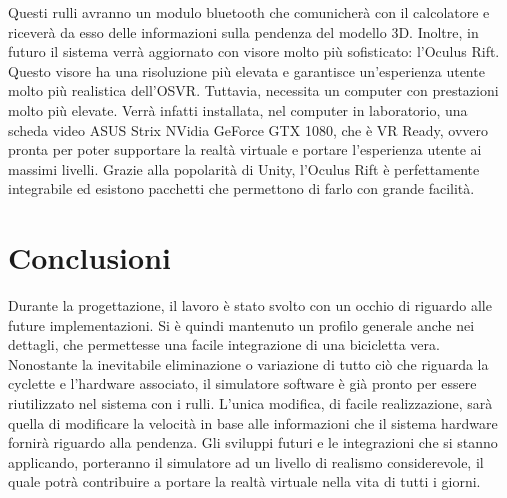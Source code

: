 \noindent Questi rulli avranno un modulo bluetooth che comunicherà con il calcolatore e riceverà da esso delle informazioni sulla pendenza del modello 3D. Inoltre, in futuro il sistema verrà aggiornato con visore molto più sofisticato: l'Oculus Rift. Questo visore ha una risoluzione più elevata e garantisce un'esperienza utente molto più realistica dell'OSVR. Tuttavia, necessita un computer con prestazioni molto più elevate. Verrà infatti installata, nel computer in laboratorio, una scheda video ASUS Strix NVidia GeForce GTX 1080, che è VR Ready, ovvero pronta per poter supportare la realtà virtuale e portare l'esperienza utente ai massimi livelli. Grazie alla popolarità di Unity, l'Oculus Rift è perfettamente integrabile ed esistono pacchetti che permettono di farlo con grande facilità.
\newpage
\section{Conclusioni}
Durante la progettazione, il lavoro è stato svolto con un occhio di riguardo alle future implementazioni. Si è quindi mantenuto un profilo generale anche nei dettagli, che permettesse una facile integrazione di una bicicletta vera. Nonostante la inevitabile eliminazione o variazione di tutto ciò che riguarda la cyclette e l'hardware associato, il simulatore software è già pronto per essere riutilizzato nel sistema con i rulli. L'unica modifica, di facile realizzazione, sarà quella di modificare la velocità in base alle informazioni che il sistema hardware fornirà riguardo alla pendenza. 
Gli sviluppi futuri e le integrazioni che si stanno applicando, porteranno il simulatore ad un livello di realismo considerevole, il quale potrà contribuire a portare la realtà virtuale nella vita di tutti i giorni.
